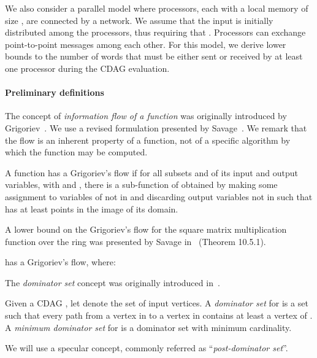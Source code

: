 \documentclass[a4paper,UKenglish]{lipics-v2016}
\begin{document}
We also consider a parallel model where  processors, each with
a local memory of size , are connected by a network. We assume that
the input is initially distributed among the processors, thus
requiring that . Processors can exchange point-to-point
messages among each other. For this model, we derive lower bounds to
the number of words that must be either sent or received by at least
one processor during the CDAG evaluation.

\paragraph*{Preliminary definitions}
The concept of \emph{information flow of a function} was originally
introduced by Grigoriev~\cite{grigor1976application}. We use a revised
formulation presented by Savage~\cite{savage97models}. We remark that
the flow is an inherent property of a function, not of a specific
algorithm by which the function may be computed.
\begin{definition}
A function  has a  Grigoriev's flow if for all subsets  and  of its  input and  output variables, with  and , there is a sub-function  of  obtained by making some assignment to variables of  not in   and discarding output variables not in  such that  has at least  points in the image of its domain. 	
\end{definition}
A lower bound on the Grigoriev's flow for the square matrix multiplication function  over the ring  was presented by Savage in~\cite{savage97models} (Theorem 10.5.1). 
 
\begin{lemma}\label{lem:info_flo_mat_mul}
	
 has a  Grigoriev's flow, where:
	
\end{lemma}

The \emph{dominator set} concept was originally introduced in~\cite{jia1981complexity}. 

\begin{definition}
Given a CDAG , let  denote the set of input
vertices. A \emph{dominator set} for  is a set  such that every path from a vertex in  to a vertex in
 contains at least a vertex of . A \emph{minimum dominator
  set} for  is a dominator set with minimum cardinality.
\end{definition}

We will use a specular concept, commonly referred as
``\emph{post-dominator set}''.
\end{document}
